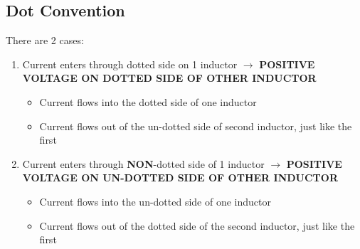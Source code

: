 \documentclass[10pt,letterpaper,final,twoside,notitlepage]{article}
\begin{document}
	\subsection*{Dot Convention} \label{subsec:Dot Convention}
		There are 2 cases:
		\begin{enumerate}
			\item Current enters through dotted side on 1 inductor $\longrightarrow$ \textbf{POSITIVE VOLTAGE ON DOTTED SIDE OF OTHER INDUCTOR}
				\begin{itemize}[noitemsep, nolistsep]
					\item Current flows into the dotted side of one inductor
					\item Current flows out of the un-dotted side of second inductor, just like the first
				\end{itemize}
			\item Current enters through \textbf{NON}-dotted side of 1 inductor $\longrightarrow$ \textbf{POSITIVE VOLTAGE ON UN-DOTTED SIDE OF OTHER INDUCTOR}
				\begin{itemize}[noitemsep, nolistsep]
					\item Current flows into the un-dotted side of one inductor
					\item Current flows out of the dotted side of the second inductor, just like the first
				\end{itemize}
		\end{enumerate}
	
\end{document}
